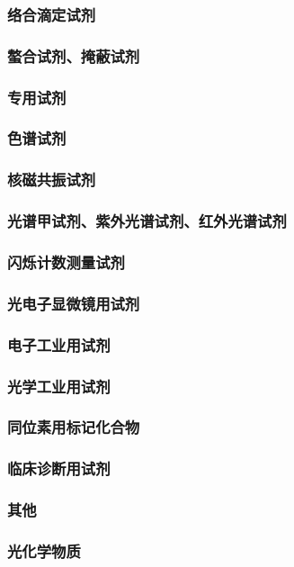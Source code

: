 \documentclass[UTF8]{../../ApplicationUniverse}
\begin{document}
        \subsubsection{络合滴定试剂}
        \subsubsection{螯合试剂、掩蔽试剂}
        \subsubsection{专用试剂}
            \subsubsection{色谱试剂}
            \subsubsection{核磁共振试剂}
            \subsubsection{光谱甲试剂、紫外光谱试剂、红外光谱试剂}
            \subsubsection{闪烁计数测量试剂}
            \subsubsection{光电子显微镜用试剂}
    \subsubsection{电子工业用试剂}
    \subsubsection{光学工业用试剂}
    \subsubsection{同位素用标记化合物}
    \subsubsection{临床诊断用试剂}
    \subsubsection{其他}
\subsubsection{光化学物质}
\end{document}
